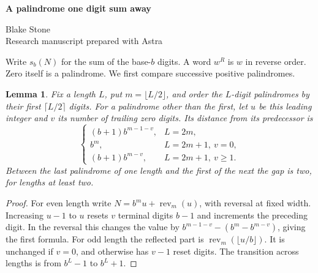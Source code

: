 \documentclass[11pt,letterpaper]{article}
\newtheorem{lemma}[theorem]{Lemma}
\begin{document}
\thispagestyle{plain}
\begin{center}
{\LARGE\bfseries A palindrome one digit sum away\par}
\vspace{0.5em}
Blake Stone\\
{\small Research manuscript prepared with Astra}
\end{center}

\begin{abstract}
We prove Derek Orr's conjecture that the decimal palindromes whose digit sum can be subtracted to leave a palindrome have exactly one term at every length of four or more. With addition, we parametrize all sufficiently large terms and find the exact upper and lower limits of their counting function divided by the decimal logarithm. In other bases the subtraction rule has a second infinite family exactly when the base is odd.
\end{abstract}

Write \(s_b(N)\) for the sum of the base-\(b\) digits. A word \(w^R\) is \(w\) in reverse order. Zero itself is a palindrome. We first compare successive positive palindromes.
\begin{lemma}\label{gap}
Fix a length \(L\), put \(m=\lfloor L/2\rfloor\), and order the \(L\)-digit palindromes by their first \(\lceil L/2\rceil\) digits. For a palindrome other than the first, let \(u\) be this leading integer and \(v\) its number of trailing zero digits. Its distance from its predecessor is
\[
 \begin{cases}
 (b+1)b^{m-1-v},&L=2m,\\
 b^m,&L=2m+1,\ v=0,\\
 (b+1)b^{m-v},&L=2m+1,\ v\ge1.
 \end{cases}
\]
Between the last palindrome of one length and the first of the next the gap is two, for lengths at least two.
\end{lemma}
\begin{proof}
For even length write \(N=b^m u+\operatorname{rev}_m(u)\), with reversal at fixed width. Increasing \(u-1\) to \(u\) resets \(v\) terminal digits \(b-1\) and increments the preceding digit. In the reversal this changes the value by \(b^{m-1-v}-(b^m-b^{m-v})\), giving the first formula. For odd length the reflected part is \(\operatorname{rev}_m(\lfloor u/b\rfloor)\). It is unchanged if \(v=0\), and otherwise has \(v-1\) reset digits. The transition across lengths is from \(b^L-1\) to \(b^L+1\).
\end{proof}
\end{document}
